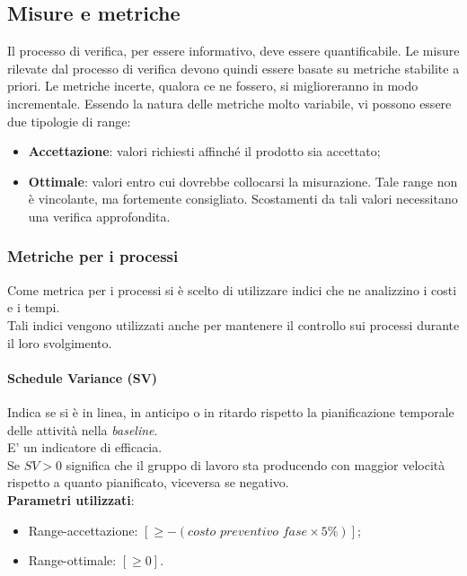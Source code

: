 \subsection{Misure e metriche}
Il processo di verifica, per essere informativo, deve essere quantificabile. Le misure rilevate dal processo di verifica devono quindi essere basate su metriche stabilite a priori. Le metriche incerte, qualora ce ne fossero, si miglioreranno in modo incrementale. Essendo la natura delle metriche molto variabile, vi possono essere due tipologie di range:
\begin{itemize}
\item \textbf{Accettazione}: valori richiesti affinché il prodotto sia accettato;
\item \textbf{Ottimale}: valori entro cui dovrebbe collocarsi la misurazione. Tale range non è vincolante, ma fortemente consigliato. Scostamenti da tali valori necessitano una verifica approfondita.
\end{itemize}

\subsubsection{Metriche per i processi}
Come metrica per i processi si è scelto di utilizzare indici che ne analizzino i costi e i tempi.\\
Tali indici vengono utilizzati anche per mantenere il controllo sui processi durante il loro svolgimento.

\paragraph{Schedule Variance (SV)}
Indica se si è in linea, in anticipo o in ritardo rispetto la pianificazione temporale delle attività nella \textit{baseline}.\\
E' un indicatore di efficacia.\\
Se $SV > 0$ significa che il gruppo di lavoro sta producendo con maggior velocità rispetto a quanto pianificato, viceversa se negativo.\\
\textbf{Parametri utilizzati}:
\begin{itemize}
\item Range-accettazione: $[\geq-(\textit{costo preventivo fase}\times5\%)]$;
\item Range-ottimale: $[\geq0]$.
\end{itemize}

